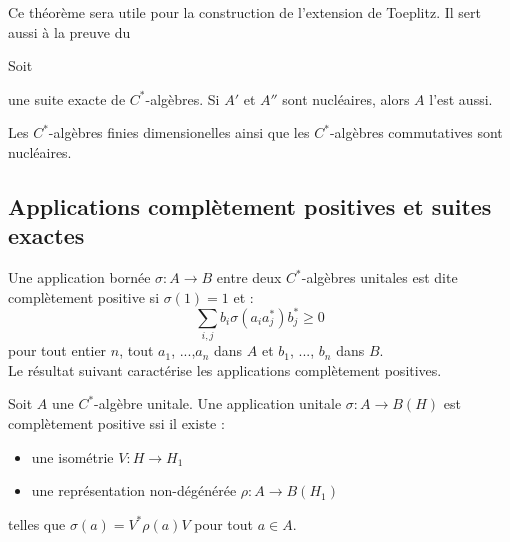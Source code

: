 Ce théorème sera utile pour la construction de l'extension de Toeplitz. Il sert aussi à la preuve du 

\begin{thm}
Soit
une suite exacte de $C^*$-algèbres. Si $A'$ et $A''$ sont nucléaires, alors $A$ l'est aussi.
\label{NucExtension}
\end{thm}

Les $C^*$-algèbres finies dimensionelles ainsi que les $C^*$-algèbres commutatives sont nucléaires.

\subsection{Applications complètement positives et suites exactes}

Une application bornée $\sigma : A \rightarrow B$ entre deux $C^*$-algèbres unitales est dite complètement positive si $\sigma (1)=1$ et :
\[\sum_{i,j} b_i\sigma(a_i a_j^*) b_j^* \geq 0\]
pour tout entier $n$, tout $a_1$, ...,$a_n$ dans $A$ et $b_1$, ..., $b_n$ dans $B$. \\
Le résultat suivant caractérise les applications complètement positives.

\begin{thm}[Stinespring]
Soit $A$ une $C^*$-algèbre unitale. Une application unitale $\sigma : A \rightarrow B(H)$ est complètement positive ssi il existe :
\begin{itemize}
\item une isométrie $V : H \rightarrow H_1$  
\item une représentation non-dégénérée $\rho : A \rightarrow B(H_1)$
\end{itemize} 
telles que $\sigma(a)=V^*\rho(a)V$ pour tout $a\in A$.
\end{thm}

